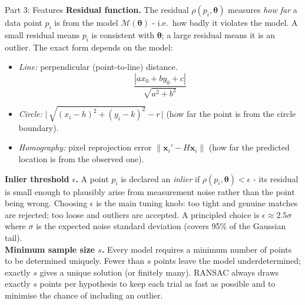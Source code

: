 \documentclass[letterpaper]{article}
\begin{document}
\begin{notes}{Part 3: Features}
\textbf{Residual function.} The residual $\rho(p_i, \boldsymbol{\theta})$ measures \emph{how far} a data point $p_i$ is from the model $\mathcal{M}(\boldsymbol{\theta})$ - i.e.\ how badly it violates the model. A small residual means $p_i$ is consistent with $\boldsymbol{\theta}$; a large residual means it is an outlier. The exact form depends on the model:
\begin{itemize}
    \item \emph{Line:} perpendicular (point-to-line) distance.
    \[
    \frac{|ax_0 + by_0 + c|}{\sqrt{a^2 + b^2}}
    \]
    
    \item \emph{Circle:} $\bigl|\,\sqrt{(x_i-h)^2+(y_i-k)^2} - r\,\bigr|$ (how far the point is from the circle boundary).
    \item \emph{Homography:} pixel reprojection error $\|\mathbf{x}_i' - H\mathbf{x}_i\|$ (how far the predicted location is from the observed one).
\end{itemize}

\textbf{Inlier threshold $\epsilon$.} A point $p_i$ is declared an \emph{inlier} if $\rho(p_i,\boldsymbol{\theta}) < \epsilon$ - its residual is small enough to plausibly arise from measurement noise rather than the point being wrong. Choosing $\epsilon$ is the main tuning knob: too tight and genuine matches are rejected; too loose and outliers are accepted. A principled choice is $\epsilon \approx 2.5\sigma$ where $\sigma$ is the expected noise standard deviation (covers 95\% of the Gaussian tail).\\

\textbf{Minimum sample size $s$.} Every model requires a minimum number of points to be determined uniquely. Fewer than $s$ points leave the model underdetermined; exactly $s$ gives a unique solution (or finitely many). RANSAC always draws exactly $s$ points per hypothesis to keep each trial as fast as possible and to minimise the chance of including an outlier.\\


\end{notes}
\end{document}

